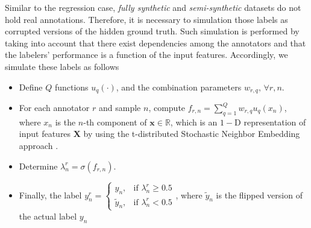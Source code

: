 \documentclass[journal]{IEEEtran}
\providecommand{\ve}[1]{{\bm{#1}}}%
\providecommand{\mat}[1]{{\bm{#1}}} %
\newcommand{\Real}{\mathbb{R}}
\providecommand{\ve}[1]{{\mathbf{#1}}}
\providecommand{\mat}[1]{{\mathbf{#1}}}
\begin{document}
Similar to the regression case, \textit{fully synthetic} and \textit{semi-synthetic} datasets do not hold real annotations. Therefore, it is necessary to simulation those labels as corrupted versions of the hidden ground truth. Such simulation is performed by taking into account that there exist dependencies among the annotators and that the labelers' performance is a function of the input features. Accordingly, we simulate these labels as follows
\begin{itemize}
    \item Define $Q$ functions $u_q(\cdot)$, and the combination parameters $w_{r,q},\,\forall r, n$.
    \item For each annotator $r$ and sample $n$, compute $f_{r,n} = \sum_{q=1}^{Q}w_{r,q}u_q(x_n)$, where $x_n$ is the $n$-th component of $\ve{x}\in \Real$, which is an $1-$D representation of input features $\mat{X}$ by using the t-distributed Stochastic Neighbor Embedding approach \cite{maaten2008visualizing}.
    \item Determine $\lambda_{n}^r = \sigma(f_{r,n})$. 
    \item Finally, the label $y_n^r = \begin{cases}y_n, &\mbox{if }\lambda_{n}^r \ge 0.5\\ \tilde{y}_n, & \mbox{if }\lambda_{n}^r <0.5 \end{cases}$, where $\tilde{y}_n$ is the flipped version of the actual label $y_n$
\end{itemize}
\end{document}

